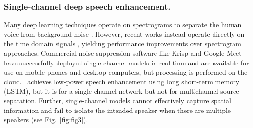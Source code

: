 \documentclass [11pt, proquest] {uwthesis}[2020/02/24]
\begin{document}
\subsubsection{Single-channel deep speech enhancement.}
Many deep learning techniques operate on spectrograms to separate the human voice from background noise \cite{realtimenoise, Mohammadiha_2013, online_nonnegative, nikzad2020deep, choi2019phaseaware, lstm_speechenhancement, fu2019metricgan, TFMasking}. However, recent works  instead operate directly on the time domain signals \cite{luo2019conv, germain2018speech, pascual2017segan, demucsreal, macartney2018improved}, yielding performance improvements over spectrogram approaches. Commercial noise suppression software like Krisp \cite{krisp} and Google Meet \cite{googlemeet} have successfully deployed single-channel models in real-time and are available for use on mobile phones and desktop computers, but {processing is performed on the cloud.}~\cite{tinylstm}  achieves low-power speech enhancement using
long short-term memory (LSTM), but it is for a  single-channel network but not for multichannel source separation. Further, single-channel models cannot effectively capture  spatial information and fail to isolate the intended speaker when there are multiple speakers (see Fig.~\ref{fig:fig3}).

\end{document}

